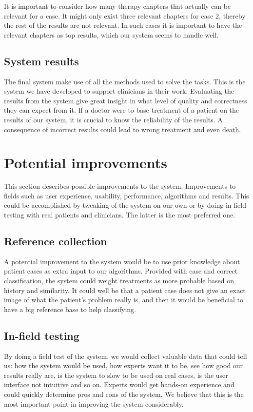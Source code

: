It is important to consider how many therapy chapters that actually can be relevant for a case. It might only exist three relevant chapters for case 2, thereby the rest of the results are not relevant. In such cases it is important to have the relevant chapters as top results, which our system seems to handle well.

\subsection{System results}
The final system make use of all the methods used to solve the tasks. This is the system we have developed to support clinicians in their work. Evaluating the results from the system give great insight in what level of quality and correctness they can expect from it. If a doctor were to base treatment of a patient on the results of our system, it is crucial to know the reliability of the results. A consequence of incorrect results could lead to wrong treatment and even death.


\section{Potential improvements}
\label{sec:potentialimp}
This section describes possible improvements to the system. Improvements to fields such as user experience, usability, performance, algorithms and results. This could be accomplished by tweaking of the system on our own or by doing in-field testing with real patients and clinicians. The latter is the most preferred one. 

\subsection{Reference collection}
A potential improvement to the system would be to use prior knowledge about patient cases as extra input to our algorithms. Provided with case and correct classification, the system could weight treatments as more probable based on history and similarity. It could well be that a patient case does not give an exact image of what the patient's problem really is, and then it would be beneficial to have a big reference base to help classifying. 

\subsection{In-field testing}
By doing a field test of the system, we would collect valuable data that could tell us: how the system would be used, how experts want it to be, see how good our results really are, is the system to slow to be used on real cases, is the user interface not intuitive and so on. Experts would get hands-on experience and could quickly determine pros and cons of the system. We believe that this is the most important point in improving the system considerably.

